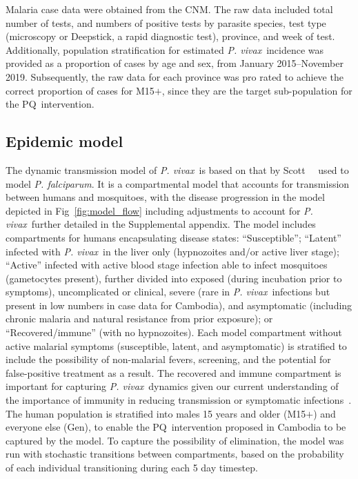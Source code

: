 \documentclass[doublespacing]{bmcart}
\newcommand{\pv}{\textit{P. vivax}}
\newcommand{\pf}{\textit{P. falciparum}}
\newcommand{\males}{M15$+$}
\newcommand{\gen}{Gen}
\newcommand{\pq}{PQ}
\begin{document}
Malaria case data were obtained from the CNM. The raw data included total number of tests, and numbers of positive tests by parasite species, test type (microscopy or Deepstick, a rapid diagnostic test), province, and week of test. Additionally, population stratification for estimated \pv~incidence was provided as a proportion of cases by age and sex, from January 2015--November 2019. Subsequently, the raw data for each province was pro rated to achieve the correct proportion of cases for \males, since they are the target sub-population for the \pq~intervention.


\subsection*{Epidemic model}

The dynamic transmission model of \pv~is based on that by Scott~\etal~\cite{scott2017} used to model \pf. It is a compartmental model that accounts for transmission between humans and mosquitoes, with the disease progression in the model depicted in Fig~\ref{fig:model_flow} including adjustments to account for \pv~further detailed in the Supplemental appendix. The model includes compartments for humans encapsulating disease states: ``Susceptible''; ``Latent'' infected with \pv~in the liver only (hypnozoites and/or active liver stage); ``Active'' infected with active blood stage infection able to infect mosquitoes (gametocytes present), further divided into exposed (during incubation prior to symptoms), uncomplicated or clinical, severe (rare in \pv~infections but present in low numbers in case data for Cambodia), and asymptomatic (including chronic malaria and natural resistance from prior exposure); or ``Recovered/immune'' (with no hypnozoites). Each model compartment without active malarial symptoms (susceptible, latent, and asymptomatic) is stratified to include the possibility of non-malarial fevers, screening, and the potential for false-positive treatment as a result. The recovered and immune compartment is important for capturing \pv~dynamics given our current understanding of the importance of immunity in reducing transmission or symptomatic infections~\cite{mueller2013natural}. The human population is stratified into males 15 years and older (\males) and everyone else (\gen), to enable the \pq~intervention proposed in Cambodia to be captured by the model. To capture the possibility of elimination, the model was run with stochastic transitions between compartments, based on the probability of each individual transitioning during each 5 day timestep.
\end{document}
